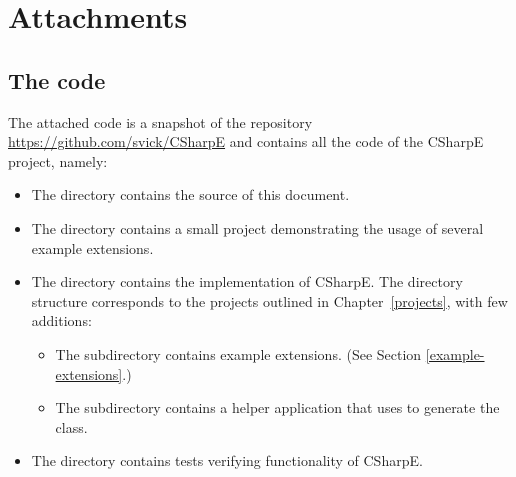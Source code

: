 \chapter{Attachments}

\section{The code}

The attached code is a snapshot of the repository \url{https://github.com/svick/CSharpE} and contains all the code of the CSharpE project, namely:

\begin{itemize}
\item The  directory contains the source of this document.

\item The  directory contains a small project demonstrating the usage of several example extensions.

\item The  directory contains the implementation of CSharpE. The directory structure corresponds to the projects outlined in Chapter~\ref{projects}, with few additions:

\begin{itemize}
\item The  subdirectory contains example extensions. (See Section \ref{example-extensions}.)

\item The  subdirectory contains a helper application that uses  to generate the  class.
\end{itemize}

\item The  directory contains tests verifying functionality of CSharpE.

\end{itemize}